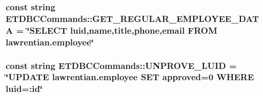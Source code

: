 \subsubsection[{G\+E\+T\+\_\+\+R\+E\+G\+U\+L\+A\+R\+\_\+\+E\+M\+P\+L\+O\+Y\+E\+E\+\_\+\+D\+A\+T\+A}]{\setlength{\rightskip}{0pt plus 5cm}const string E\+T\+D\+B\+C\+Commands\+::\+G\+E\+T\+\_\+\+R\+E\+G\+U\+L\+A\+R\+\_\+\+E\+M\+P\+L\+O\+Y\+E\+E\+\_\+\+D\+A\+T\+A = \char`\"{}S\+E\+L\+E\+C\+T luid,name,title,phone,email F\+R\+O\+M lawrentian.\+employee\char`\"{}}\label{namespace_e_t_d_b_c_commands_a5d22b26a78eed8afdd2c5f89468b8a1b}
\hypertarget{namespace_e_t_d_b_c_commands_a0f9fcebb6f4bed5812550e62f6f009db}{}
\subsubsection[{U\+N\+P\+R\+O\+V\+E\+\_\+\+L\+U\+I\+D}]{\setlength{\rightskip}{0pt plus 5cm}const string E\+T\+D\+B\+C\+Commands\+::\+U\+N\+P\+R\+O\+V\+E\+\_\+\+L\+U\+I\+D = \char`\"{}U\+P\+D\+A\+T\+E lawrentian.\+employee S\+E\+T approved=0 W\+H\+E\+R\+E luid=\+:id\char`\"{}}\label{namespace_e_t_d_b_c_commands_a0f9fcebb6f4bed5812550e62f6f009db}
